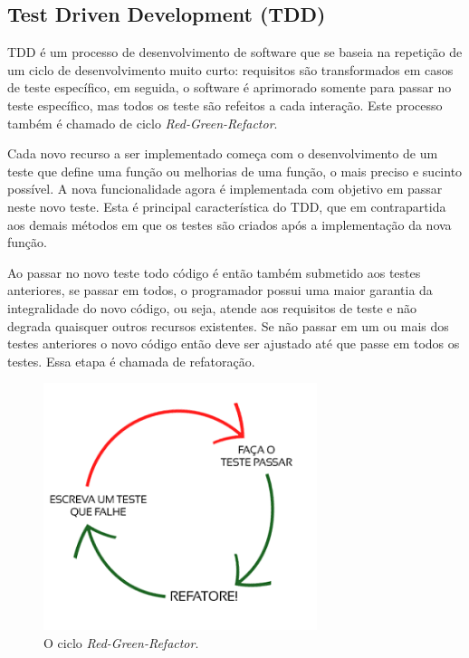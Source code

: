 \subsection{Test Driven Development (TDD)}
\par TDD é um processo de desenvolvimento de software que se baseia na repetição de um ciclo de desenvolvimento muito curto: requisitos são transformados em casos de teste específico, em seguida, o software é aprimorado somente para passar no teste específico, mas todos os teste são refeitos a cada interação. Este processo também é chamado de ciclo \emph{Red-Green-Refactor}.
\par Cada novo recurso a ser implementado começa com o desenvolvimento de um teste que define uma função ou melhorias de uma função, o mais preciso e sucinto possível. A nova funcionalidade agora é implementada com objetivo em passar neste novo teste. Esta é principal característica do TDD, que em contrapartida aos demais métodos em que os testes são criados após a implementação da nova função.
\par Ao passar no novo teste todo código é então também submetido aos testes anteriores, se passar em todos, o programador possui uma maior garantia da integralidade do novo código, ou seja, atende aos requisitos de teste e não degrada quaisquer outros recursos existentes. Se não passar em um ou mais dos testes anteriores o novo código então deve ser ajustado até que passe em todos os testes. Essa etapa é chamada de refatoração.
\begin{figure}[!htb]
\centering
\includegraphics[width=8cm]{figuras/red_green}
\caption{\label{fig:red_green}O ciclo \emph{Red-Green-Refactor}.}
\end{figure}
